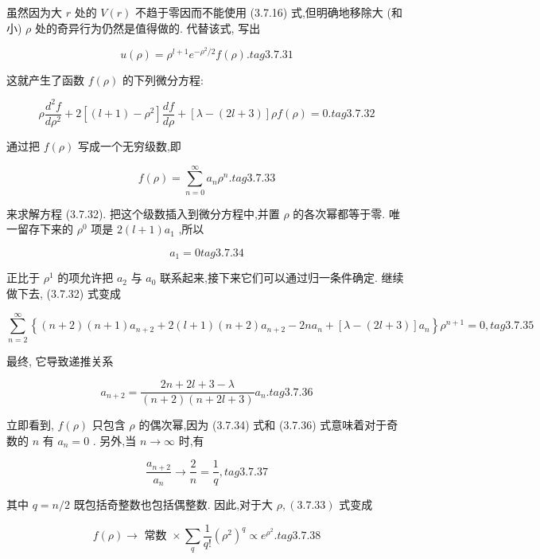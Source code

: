 虽然因为大 $r$ 处的 $V\left( r\right)$ 不趋于零因而不能使用 (3.7.16) 式,但明确地移除大 (和小) $\rho$ 处的奇异行为仍然是值得做的. 代替该式, 写出

$$
u\left( \rho \right) = {\rho }^{l + 1}{e}^{-{\rho }^{2}/2}f\left( \rho \right) . tag{3. 7.31}
$$

这就产生了函数 $f\left( \rho \right)$ 的下列微分方程:

$$
\rho \frac{{d}^{2}f}{d{\rho }^{2}} + 2\left\lbrack {\left( {l + 1}\right) - {\rho }^{2}}\right\rbrack \frac{df}{d\rho } + \left\lbrack {\lambda - \left( {{2l} + 3}\right) }\right\rbrack {\rho f}\left( \rho \right) = 0. tag{3. 7.32}
$$

通过把 $f\left( \rho \right)$ 写成一个无穷级数,即

$$
f\left( \rho \right) = \mathop{\sum }\limits_{{n = 0}}^{\infty }{a}_{n}{\rho }^{n}. tag{3. 7.33}
$$

来求解方程 (3.7.32). 把这个级数插入到微分方程中,并置 $\rho$ 的各次幂都等于零. 唯一留存下来的 ${\rho }^{0}$ 项是 $2\left( {l + 1}\right) {a}_{1}$ ,所以

$$
{a}_{1} = 0 tag{3. 7.34}
$$

正比于 ${\rho }^{1}$ 的项允许把 ${a}_{2}$ 与 ${a}_{0}$ 联系起来,接下来它们可以通过归一条件确定. 继续做下去, (3.7.32) 式变成

$$
\mathop{\sum }\limits_{{n = 2}}^{\infty }\left\{ {\left( {n + 2}\right) \left( {n + 1}\right) {a}_{n + 2} + 2\left( {l + 1}\right) \left( {n + 2}\right) {a}_{n + 2} - {2n}{a}_{n} + \left\lbrack {\lambda - \left( {{2l} + 3}\right) }\right\rbrack {a}_{n}}\right\} {\rho }^{n + 1} = 0, tag{3. 7.35}
$$

最终, 它导致递推关系

$$
{a}_{n + 2} = \frac{{2n} + {2l} + 3 - \lambda }{\left( {n + 2}\right) \left( {n + {2l} + 3}\right) }{a}_{n}. tag{3. 7.36}
$$

立即看到, $f\left( \rho \right)$ 只包含 $\rho$ 的偶次幂,因为 (3.7.34) 式和 (3.7.36) 式意味着对于奇数的 $n$ 有 ${a}_{n} = 0$ . 另外,当 $n \rightarrow \infty$ 时,有

$$
\frac{{a}_{n + 2}}{{a}_{n}} \rightarrow \frac{2}{n} = \frac{1}{q}, tag{3. 7.37}
$$

其中 $q = n/2$ 既包括奇整数也包括偶整数. 因此,对于大 $\rho ,\left( {3.7.33}\right)$ 式变成

$$
f\left( \rho \right) \rightarrow \text{ 常数 } \times \mathop{\sum }\limits_{q}\frac{1}{q!}{\left( {\rho }^{2}\right) }^{q} \propto {e}^{{\rho }^{2}}. tag{3. 7.38}
$$

